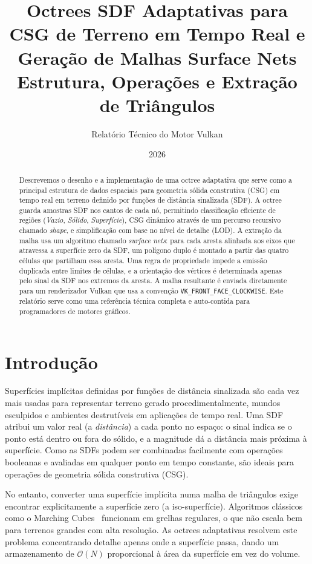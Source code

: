 \documentclass[10pt,a4paper]{article}
\title{%
  \textbf{Octrees SDF Adaptativas para CSG de Terreno em Tempo Real e Geração de Malhas Surface Nets}\\[4pt]
  {\large Estrutura, Operações e Extração de Triângulos}
}
\author{Relatório Técnico do Motor Vulkan}
\date{2026}
\begin{document}
\maketitle

\begin{abstract}
Descrevemos o desenho e a implementação de uma octree adaptativa que
serve como a principal estrutura de dados espaciais para geometria
sólida construtiva (CSG) em tempo real em terreno definido por funções
de distância sinalizada (SDF). A octree guarda amostras SDF nos cantos
de cada nó, permitindo classificação eficiente de regiões (\emph{Vazio},
\emph{Sólido}, \emph{Superfície}), CSG dinâmico através de um percurso
recursivo chamado \emph{shape}, e simplificação com base no nível de
detalhe (LOD). A extração da malha usa um algoritmo chamado
\emph{surface nets}: para cada aresta alinhada aos eixos que atravessa
a superfície zero da SDF, um polígono duplo é montado a partir das
quatro células que partilham essa aresta. Uma regra de propriedade
impede a emissão duplicada entre limites de células, e a orientação
dos vértices é determinada apenas pelo sinal da SDF nos extremos da
aresta. A malha resultante é enviada diretamente para um renderizador
Vulkan que usa a convenção \texttt{VK\_FRONT\_FACE\_CLOCKWISE}. Este
relatório serve como uma referência técnica completa e auto-contida
para programadores de motores gráficos.
\end{abstract}

\tableofcontents
\newpage

\section{Introdução}
\label{sec:intro}

Superfícies implícitas definidas por funções de distância sinalizada
são cada vez mais usadas para representar terreno gerado
procedimentalmente, mundos esculpidos e ambientes destrutíveis em
aplicações de tempo real. Uma SDF atribui um valor real (a
\emph{distância}) a cada ponto no espaço: o sinal indica se o ponto
está dentro ou fora do sólido, e a magnitude dá a distância mais
próxima à superfície. Como as SDFs podem ser combinadas facilmente
com operações booleanas e avaliadas em qualquer ponto em tempo
constante, são ideais para operações de geometria sólida construtiva
(CSG).

No entanto, converter uma superfície implícita numa malha de
triângulos exige encontrar explicitamente a superfície zero (a
iso-superfície). Algoritmos clássicos como o Marching
Cubes~\cite{lorensen87} funcionam em grelhas regulares, o que não
escala bem para terrenos grandes com alta resolução. As octrees
adaptativas resolvem este problema concentrando detalhe apenas onde
a superfície passa, dando um armazenamento de $\mathcal{O}(N)$
proporcional à área da superfície em vez do volume.
\end{document}
